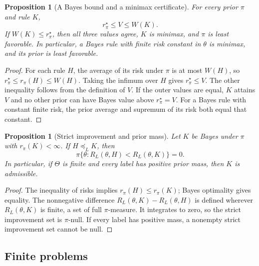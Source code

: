 \documentclass[11pt,oneside]{book}
\newtheorem{proposition}[theorem]{Proposition}
\theoremstyle{definition}
\theoremstyle{remark}
\begin{document}
\begin{proposition}[A Bayes bound and a minimax certificate]
\label{prop:bayes-minimax-certificate}
For every prior $\pi$ and rule $K$,
\[
r_\pi^\star\leq V\leq W(K).
\]
If $W(K)\leq r_\pi^\star$, then all three values agree, $K$ is minimax,
and $\pi$ is least favorable. In particular, a Bayes rule with finite
risk constant in $\theta$ is minimax, and its prior is least favorable.
\end{proposition}
\begin{proof}
For each rule $H$, the average of its risk under $\pi$ is at most
$W(H)$, so $r_\pi^\star\leq r_\pi(H)\leq W(H)$. Taking the infimum
over $H$ gives $r_\pi^\star\leq V$. The other inequality follows from
the definition of $V$. If the outer values are equal, $K$ attains $V$
and no other prior can have Bayes value above $r_\pi^\star=V$.
For a Bayes rule with constant finite risk, the prior average and
supremum of its risk both equal that constant.
\end{proof}

\begin{proposition}[Strict improvement and prior mass]
\label{prop:bayes-admissibility-mass}
Let $K$ be Bayes under $\pi$ with $r_\pi(K)<\infty$.
If $H\preceq_L K$, then
\[
\pi\{\theta:R_L(\theta,H)<R_L(\theta,K)\}=0.
\]
In particular, if $\Theta$ is finite and every label has positive prior
mass, then $K$ is admissible.
\end{proposition}
\begin{proof}
The inequality of risks implies $r_\pi(H)\leq r_\pi(K)$; Bayes
optimality gives equality. The nonnegative difference
$R_L(\theta,K)-R_L(\theta,H)$ is defined wherever $R_L(\theta,K)$
is finite, a set of full $\pi$-measure. It integrates to zero,
so the strict improvement set is $\pi$-null. If every label has
positive mass, a nonempty strict improvement set cannot be null.
\end{proof}

\subsection{Finite problems}
\label{subsec:finite-minimax}
\end{document}
